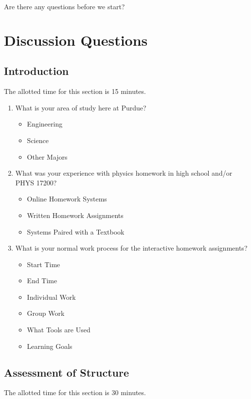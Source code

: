 Are there any questions before we start?

\section{Discussion Questions}

\subsection{Introduction}
The allotted time for this section is 15 minutes.

\begin{enumerate}
	\item What is your area of study here at Purdue?
	\begin{itemize}
		\item Engineering
		\item Science
		\item Other Majors
	\end{itemize}
	\item What was your experience with physics homework in high school and/or PHYS 17200?
	\begin{itemize}
		\item Online Homework Systems
		\item Written Homework Assignments
		\item Systems Paired with a Textbook
	\end{itemize}
	\item What is your normal work process for the interactive homework assignments?
	\begin{itemize}
		\item Start Time
		\item End Time
		\item Individual Work
		\item Group Work
		\item What Tools are Used
		\item Learning Goals
	\end{itemize}
\end{enumerate}

\subsection{Assessment of Structure}
The allotted time for this section is 30 minutes.

